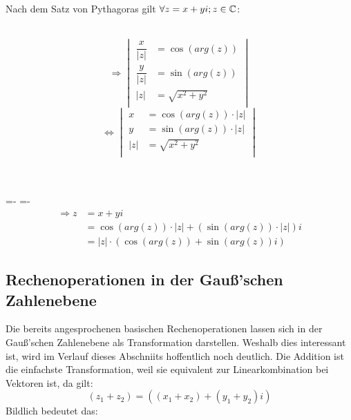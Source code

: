 \documentclass[main.tex]{subfiles}
\begin{document}
		\begin{Beweis}
			Nach dem Satz von Pythagoras gilt $\forall z = x + yi ; z \in \mathbb{C}$:
			\\\\
			\begin{minipage}{0.29\textwidth}
				\text{ }
			\end{minipage}
			\begin{minipage}{0.71\textwidth}
				$$\Rightarrow	 \begin{vmatrix}
					\dfrac{x}{|z|} &= \cos(arg(z)) 	   \\
					\dfrac{y}{|z|} &= \sin(arg(z)) 	   \\
								|z| &= \sqrt{x^2 + y^2} \\
				\end{vmatrix}$$
				$$\Leftrightarrow \begin{vmatrix}
						x &= \cos(arg(z)) \cdot |z| \\
						y &= \sin(arg(z)) \cdot |z| \\
					|z| &= \sqrt{x^2 + y^2} 	  \\
				\end{vmatrix}$$
			\end{minipage}
			\\\\
			\abovedisplayskip=-\baselineskip
			\belowdisplayskip=0pt
			\abovedisplayshortskip=-\baselineskip
			\belowdisplayshortskip=0pt
			\begin{align*}
				\Rightarrow z &= x + yi \\
							  &= \cos(arg(z)) \cdot |z| + (\sin(arg(z)) \cdot |z|)i \\
							  &= |z| \cdot (\cos(arg(z)) + \sin(arg(z))i)
			\end{align*}

		\end{Beweis}

	\subsection{Rechenoperationen in der Gauß'schen Zahlenebene}

		Die bereits angesprochenen basischen Rechenoperationen lassen sich in der Gauß'schen Zahlenebene als Transformation darstellen. Weshalb dies interessant ist, wird im Verlauf dieses Abschniits hoffentlich noch deutlich.
		Die Addition ist die einfachste Transformation, weil sie equivalent zur Linearkombination bei Vektoren ist, da gilt: $$(z_1 + z_2) = ((x_1 + x_2) + (y_1 + y_2)i)$$ Bildlich bedeutet das:
\end{document}

